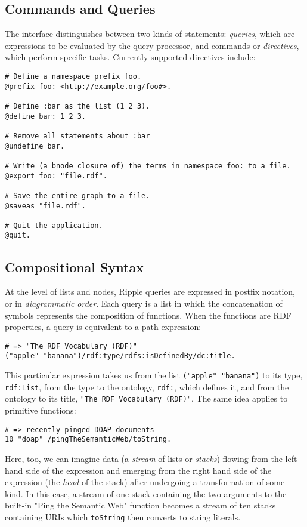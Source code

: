 \documentclass[runningheads]{llncs}
\begin{document}
\subsection{Commands and Queries}
The interface distinguishes between two kinds of statements: \textit{queries}, which are expressions to be evaluated by the query processor, and commands or \textit{directives}, which perform specific tasks.  Currently supported directives include:
\newline
\begin{verbatim}
# Define a namespace prefix foo.
@prefix foo: <http://example.org/foo#>.

# Define :bar as the list (1 2 3).
@define bar: 1 2 3.

# Remove all statements about :bar
@undefine bar.

# Write (a bnode closure of) the terms in namespace foo: to a file.
@export foo: "file.rdf".

# Save the entire graph to a file.
@saveas "file.rdf".

# Quit the application.
@quit.
\end{verbatim}


\subsection{Compositional Syntax}
At the level of lists and nodes, Ripple queries are expressed in postfix notation, or in \textit{diagrammatic order}.  Each query is a list in which the concatenation of symbols represents the composition of functions.  When the functions are RDF properties, a query is equivalent to a path expression:
\begin{verbatim}
# => "The RDF Vocabulary (RDF)"
("apple" "banana")/rdf:type/rdfs:isDefinedBy/dc:title.
\end{verbatim}

This particular expression takes us from the list \texttt{("apple" "banana")} to its type, \texttt{rdf:List}, from the type to the ontology, \texttt{rdf:}, which defines it, and from the ontology to its title, \texttt{"The RDF Vocabulary (RDF)"}.  The same idea applies to primitive functions:
\begin{verbatim}
# => recently pinged DOAP documents
10 "doap" /pingTheSemanticWeb/toString.
\end{verbatim}

Here, too, we can imagine data (a \textit{stream} of lists or \textit{stacks}) flowing from the left hand side of the expression and emerging from the right hand side of the expression (the \textit{head} of the stack) after undergoing a transformation of some kind.  In this case, a stream of one stack containing the two arguments to the built-in "Ping the Semantic Web" function becomes a stream of ten stacks containing URIs which \texttt{toString} then converts to string literals.
\end{document}
